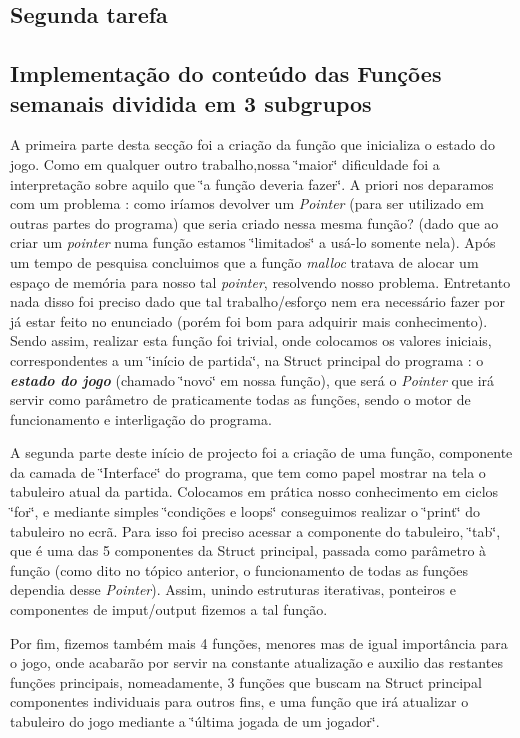 \subsection*{Segunda tarefa}

\subsection*{Implementação do conteúdo das Funções semanais {\bfseries dividida em 3 subgrupos}}

A primeira parte desta secção foi a criação da função que inicializa o estado do jogo. Como em qualquer outro trabalho,nossa \char`\"{}maior\char`\"{} dificuldade foi a interpretação sobre aquilo que \char`\"{}a função deveria fazer\char`\"{}. A priori nos deparamos com um problema \+: como iríamos devolver um {\itshape Pointer} (para ser utilizado em outras partes do programa) que seria criado nessa mesma função? (dado que ao criar um {\itshape pointer} numa função estamos \char`\"{}limitados\char`\"{} a usá-\/lo somente nela). Após um tempo de pesquisa concluimos que a função {\itshape malloc} tratava de alocar um espaço de memória para nosso tal {\itshape pointer}, resolvendo nosso problema. Entretanto nada disso foi preciso dado que tal trabalho/esforço nem era necessário fazer por já estar feito no enunciado (porém foi bom para adquirir mais conhecimento). Sendo assim, realizar esta função foi trivial, onde colocamos os valores iniciais, correspondentes a um \char`\"{}início de partida\char`\"{}, na Struct principal do programa \+: o {\itshape {\bfseries estado do jogo}} (chamado \char`\"{}novo\char`\"{} em nossa função), que será o {\itshape Pointer} que irá servir como parâmetro de praticamente todas as funções, sendo o motor de funcionamento e interligação do programa.

A segunda parte deste início de projecto foi a criação de uma função, componente da camada de \char`\"{}\+Interface\char`\"{} do programa, que tem como papel mostrar na tela o tabuleiro atual da partida. Colocamos em prática nosso conhecimento em ciclos \char`\"{}for\char`\"{}, e mediante simples \char`\"{}condições e loops\char`\"{} conseguimos realizar o \char`\"{}print\char`\"{} do tabuleiro no ecrã. Para isso foi preciso acessar a componente do tabuleiro, \char`\"{}tab\char`\"{}, que é uma das 5 componentes da Struct principal, passada como parâmetro à função (como dito no tópico anterior, o funcionamento de todas as funções dependia desse {\itshape Pointer}). Assim, unindo estruturas iterativas, ponteiros e componentes de imput/output fizemos a tal função.

Por fim, fizemos também mais 4 funções, menores mas de igual importância para o jogo, onde acabarão por servir na constante atualização e auxilio das restantes funções principais, nomeadamente, 3 funções que buscam na Struct principal componentes individuais para outros fins, e uma função que irá atualizar o tabuleiro do jogo mediante a \char`\"{}última jogada de um jogador\char`\"{}. 